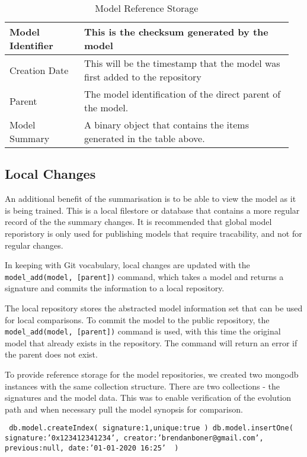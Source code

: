 \begin{table}[h]
\caption{Model Reference Storage}

\begin{tabular}{| p{0.25\linewidth} | p{0.7\linewidth} |}
    \hline
    Model Identifier    & This is the checksum generated by the model \\
    \hline
    Creation Date       & This will be the timestamp that the model was first added to the repository \\
    \hline
    Parent              & The model identification of the direct parent of the model. \\
    \hline
    Model Summary       & A binary object that contains the items generated in the table above. \\
    \hline 
    
\end{tabular}
\end{table}

\subsection{Local Changes}

An additional benefit of the summarisation is to be able to view the model as it is being trained. This is a local filestore or database that contains a more regular record of the the summary changes. It is recommended that global model reporistory is only used for publishing models that require tracability, and not for regular changes.

In keeping with Git vocabulary, local changes are updated with the \verb|model_add(model, [parent])| command, which takes a model and returns a signature and commits the information to a local repository.

The local repository stores the abstracted model information set that can be used for local comparisons.
To commit the model to the public repository, the \verb|model_add(model, [parent])| command is used, with this time the original model that already exists in the repository. The command will return an error if the parent does not exist.


To provide reference storage for the model repositories, we created two mongodb instances with the same collection structure. There are two collections - the signatures and the model data. This was to enable verification of the evolution path and when necessary pull the model synopsis for comparison.

\texttt{
    db.model.createIndex( {signature:1},{unique:true} )
    db.model.insertOne( { signature:'0x123412341234', creator:'brendanboner@gmail.com', previous:null, date:'01-01-2020 16:25' } )
}

